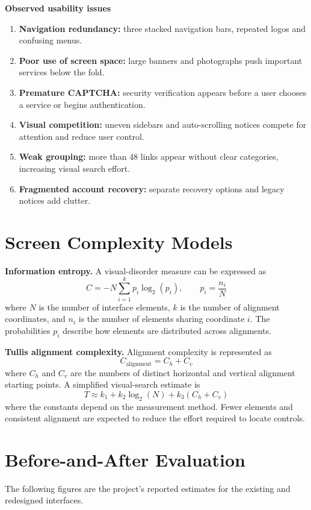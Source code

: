 \documentclass[10pt,a4paper]{article}
\begin{document}
\textbf{Observed usability issues}
\begin{enumerate}
\item \textbf{Navigation redundancy:} three stacked navigation bars, repeated logos and confusing menus.
\item \textbf{Poor use of screen space:} large banners and photographs push important services below the fold.
\item \textbf{Premature CAPTCHA:} security verification appears before a user chooses a service or begins authentication.
\item \textbf{Visual competition:} uneven sidebars and auto-scrolling notices compete for attention and reduce user control.
\item \textbf{Weak grouping:} more than 48 links appear without clear categories, increasing visual search effort.
\item \textbf{Fragmented account recovery:} separate recovery options and legacy notices add clutter.
\end{enumerate}

\section{Screen Complexity Models}
\textbf{Information entropy.} A visual-disorder measure can be expressed as
\[
C=-N\sum_{i=1}^{k}p_i\log_2(p_i), \qquad p_i=\frac{n_i}{N}
\]
where \(N\) is the number of interface elements, \(k\) is the number of alignment coordinates, and \(n_i\) is the number of elements sharing coordinate \(i\). The probabilities \(p_i\) describe how elements are distributed across alignments.

\textbf{Tullis alignment complexity.} Alignment complexity is represented as
\[
C_{\mathrm{alignment}}=C_h+C_v
\]
where \(C_h\) and \(C_v\) are the numbers of distinct horizontal and vertical alignment starting points. A simplified visual-search estimate is
\[
T\approx k_1+k_2\log_2(N)+k_3(C_h+C_v)
\]
where the constants depend on the measurement method. Fewer elements and consistent alignment are expected to reduce the effort required to locate controls.

\section{Before-and-After Evaluation}
The following figures are the project's reported estimates for the existing and redesigned interfaces.
\end{document}
